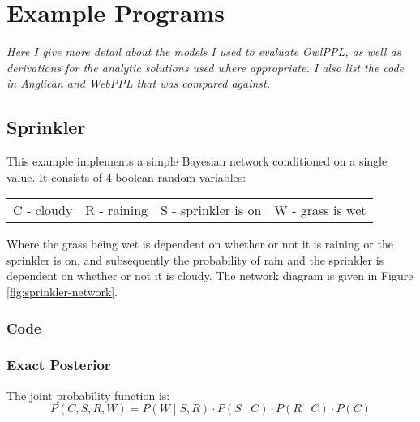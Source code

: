 
\chapter{Example Programs} \label{app:examples}
\textit{Here I give more detail about the models I used to evaluate OwlPPL, as well as derivations for the analytic solutions used where appropriate. I also list the code in Anglican and WebPPL that was compared against.}

\section{Sprinkler} \label{app:sprinkler}


This example implements a simple Bayesian network conditioned on a single value. It consists of 4 boolean random variables:
% 
\begin{center}
	\begin{tabular}{cccc}
		C - cloudy          &   
		R - raining         &   
		S - sprinkler is on &   
		W - grass is wet
	\end{tabular}
\end{center}
% 
Where the grass being wet is dependent on whether or not it is raining or the sprinkler is on, and subsequently the probability of rain and the sprinkler is dependent on whether or not it is cloudy. The network diagram is given in Figure \ref{fig:sprinkler-network}.
\subsection{Code}
\begin{figure}[!ht]
	\begin{minipage}{0.5\linewidth}
	\end{minipage}
	\begin{minipage}{0.5\linewidth}
	\end{minipage}
\end{figure}

\subsection{Exact Posterior}
The joint probability function is:
\[
	P(C,S,R,W) = P(W\mid S,R)\cdot P(S\mid C)\cdot P(R\mid C)\cdot P(C)
\]

